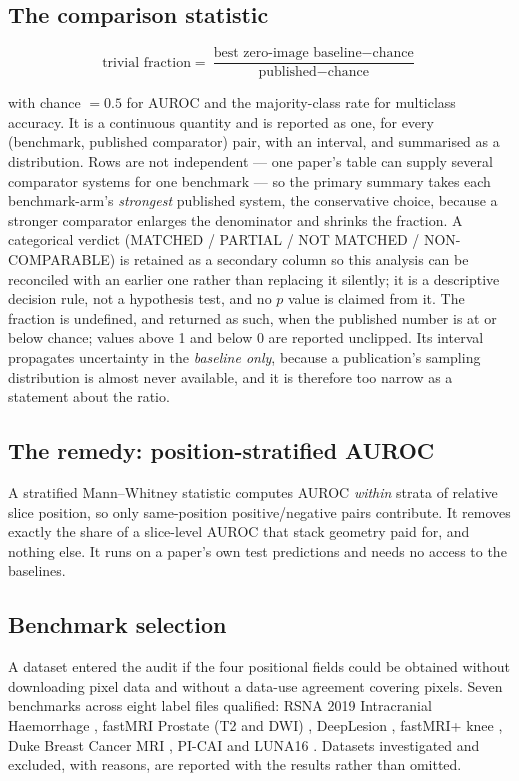 \documentclass[11pt,a4paper]{article}
\begin{document}
\subsection{The comparison statistic}

\begin{equation}
\text{trivial fraction}=\frac{\text{best zero-image baseline}-\text{chance}}
{\text{published}-\text{chance}}
\end{equation}

with chance $=0.5$ for AUROC and the majority-class rate for multiclass accuracy.
It is a continuous quantity and is reported as one, for every (benchmark,
published comparator) pair, with an interval, and summarised as a distribution.
Rows are not independent --- one paper's table can supply several comparator
systems for one benchmark --- so the primary summary takes each benchmark-arm's
\emph{strongest} published system, the conservative choice, because a stronger
comparator enlarges the denominator and shrinks the fraction. A categorical
verdict (MATCHED / PARTIAL / NOT MATCHED / NON-COMPARABLE) is retained as a
secondary column so this analysis can be reconciled with an earlier one rather
than replacing it silently; it is a descriptive decision rule, not a hypothesis
test, and no $p$ value is claimed from it. The fraction is undefined, and
returned as such, when the published number is at or below chance; values above
1 and below 0 are reported unclipped. Its interval propagates uncertainty in the
\emph{baseline only}, because a publication's sampling distribution is almost
never available, and it is therefore too narrow as a statement about the ratio.

\subsection{The remedy: position-stratified AUROC}

A stratified Mann--Whitney statistic computes AUROC \emph{within} strata of
relative slice position, so only same-position positive/negative pairs
contribute. It removes exactly the share of a slice-level AUROC that stack
geometry paid for, and nothing else. It runs on a paper's own test predictions
and needs no access to the baselines.

\subsection{Benchmark selection}

A dataset entered the audit if the four positional fields could be obtained
without downloading pixel data and without a data-use agreement covering pixels.
Seven benchmarks across eight label files qualified: RSNA 2019 Intracranial
Haemorrhage \citep{flanders2020rsnaich}, fastMRI Prostate (T2 and DWI)
\citep{tibrewala2023fastmriprostate}, DeepLesion \citep{yan2018deeplesion}, fastMRI+ knee
\citep{zhao2022fastmriplus}, Duke Breast Cancer MRI \citep{saha2021dukebreastmri,saha2018radiogenomics}, PI-CAI
\citep{saha2024picai} and LUNA16 \citep{setio2017luna16}. Datasets investigated and
excluded, with reasons, are reported with the results rather than omitted.
\end{document}
